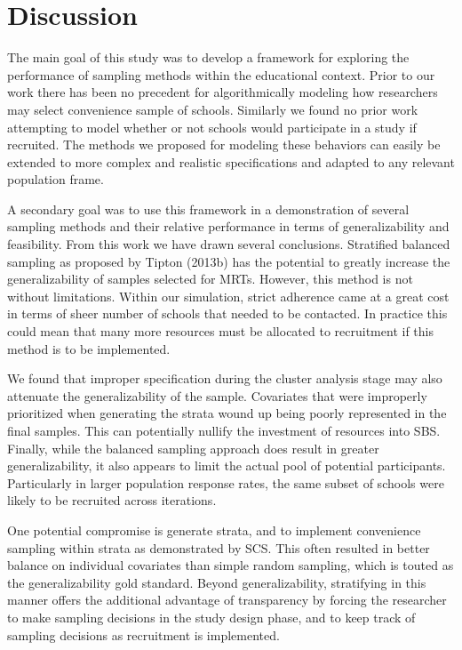 \documentclass[man,floatsintext]{apa6}
\begin{document}
\hypertarget{discussion}{%
\section{Discussion}\label{discussion}}

The main goal of this study was to develop a framework for exploring the performance of sampling methods within the educational context. Prior to our work there has been no precedent for algorithmically modeling how researchers may select convenience sample of schools. Similarly we found no prior work attempting to model whether or not schools would participate in a study if recruited. The methods we proposed for modeling these behaviors can easily be extended to more complex and realistic specifications and adapted to any relevant population frame.

A secondary goal was to use this framework in a demonstration of several sampling methods and their relative performance in terms of generalizability and feasibility. From this work we have drawn several conclusions. Stratified balanced sampling as proposed by Tipton (2013b) has the potential to greatly increase the generalizability of samples selected for MRTs. However, this method is not without limitations. Within our simulation, strict adherence came at a great cost in terms of sheer number of schools that needed to be contacted. In practice this could mean that many more resources must be allocated to recruitment if this method is to be implemented.

We found that improper specification during the cluster analysis stage may also attenuate the generalizability of the sample. Covariates that were improperly prioritized when generating the strata wound up being poorly represented in the final samples. This can potentially nullify the investment of resources into SBS. Finally, while the balanced sampling approach does result in greater generalizability, it also appears to limit the actual pool of potential participants. Particularly in larger population response rates, the same subset of schools were likely to be recruited across iterations.

One potential compromise is generate strata, and to implement convenience sampling within strata as demonstrated by SCS. This often resulted in better balance on individual covariates than simple random sampling, which is touted as the generalizability gold standard. Beyond generalizability, stratifying in this manner offers the additional advantage of transparency by forcing the researcher to make sampling decisions in the study design phase, and to keep track of sampling decisions as recruitment is implemented.
\end{document}
